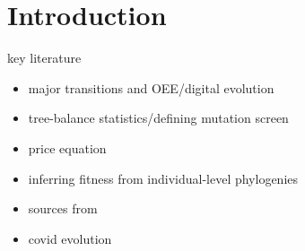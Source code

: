 \section{Introduction} \label{sec:introduction}

key literature
\begin{itemize}
\item major transitions and OEE/digital evolution \citep{vostinar2021symbulation,dolson2019modes,dolson2024what,moreno2019toward}
\item tree-balance statistics/defining mutation screen \citep{BonettiFranceschi2024phylogenetic}
\item price equation \citep{price1972fishers}
\item inferring fitness from individual-level phylogenies \citep{nozoe2017inferring,kuo2025bayesian}
\item sources from \citep{moreno2024ecology}
\item covid evolution \citep{markov2023evolution}
\end{itemize}

